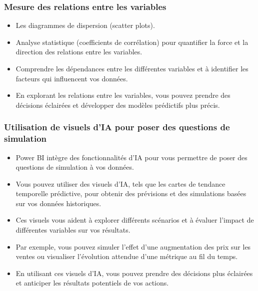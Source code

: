 \documentclass{beamer}
\begin{document}
\begin{frame}
	\frametitle{Mesure des relations entre les variables}
	
	\begin{itemize}
		\item Les diagrammes de dispersion (scatter plots).
		\item Analyse statistique (coefficients de corrélation) pour quantifier la force et la direction des relations entre les variables.
		\item Comprendre les dépendances entre les différentes variables et à identifier les facteurs qui influencent vos données.
		\item En explorant les relations entre les variables, vous pouvez prendre des décisions éclairées et développer des modèles prédictifs plus précis.
	\end{itemize}
	
\end{frame}




\begin{frame}
	\frametitle{Utilisation de visuels d'IA pour poser des questions de simulation}
	
	\begin{itemize}
		\item Power BI intègre des fonctionnalités d'IA pour vous permettre de poser des questions de simulation à vos données.
		\item Vous pouvez utiliser des visuels d'IA, tels que les cartes de tendance temporelle prédictive, pour obtenir des prévisions et des simulations basées sur vos données historiques.
		\item Ces visuels vous aident à explorer différents scénarios et à évaluer l'impact de différentes variables sur vos résultats.
		\item Par exemple, vous pouvez simuler l'effet d'une augmentation des prix sur les ventes ou visualiser l'évolution attendue d'une métrique au fil du temps.
		\item En utilisant ces visuels d'IA, vous pouvez prendre des décisions plus éclairées et anticiper les résultats potentiels de vos actions.
	\end{itemize}
	
\end{frame}
\end{document}
